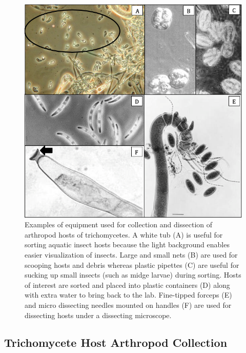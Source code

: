 \documentclass[]{book}
\begin{document}
\begin{figure}

{\centering \includegraphics[width=8.72in]{img/Ch4_Fig6} 

}

\caption{Examples of equipment used for collection and dissection of arthropod hosts of trichomycetes. A white tub (A) is useful for sorting aquatic insect hosts because the light background enables easier visualization of insects.  Large and small nets (B) are used for scooping hosts and debris whereas plastic pipettes (C) are useful for sucking up small insects (such as midge larvae) during sorting.  Hosts of interest are sorted and placed into plastic containers (D) along with extra water to bring back to the lab.  Fine-tipped forceps (E) and micro dissecting needles mounted on handles (F) are used for dissecting hosts under a dissecting microscope.}\label{fig:ch4fig6}
\end{figure}

\hypertarget{trichomycete-host-arthropod-collection}{%
\subsection{\texorpdfstring{\textbf{{Trichomycete Host Arthropod Collection}}}{Trichomycete Host Arthropod Collection}}\label{trichomycete-host-arthropod-collection}}
\end{document}
